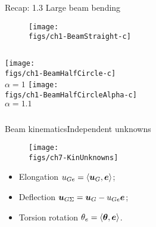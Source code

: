 \begin{frame}{Recap: 1.3 Large beam bending}

\vskip-20pt
\begin{figure}
\centering\texttt{[image: \\figs/ch1-BeamStraight-c]}
\end{figure}
\vskip-10pt
\begin{columns}
\centering\texttt{[image: \\figs/ch1-BeamHalfCircle-c]}\\
$\alpha=1$
\centering\texttt{[image: \\figs/ch1-BeamHalfCircleAlpha-c]}\\
$\alpha=1.1$
\end{columns}

\end{frame}

\begin{frame}{Beam kinematics}{Independent unknowns}

\begin{figure}
\centering\texttt{[image: \\figs/ch7-KinUnknowns]}
\end{figure}

\begin{itemize}
\item Elongation $u_{Ge}=\left\langle{{\boldsymbol{u}}_G,{\boldsymbol{e}}}\right\rangle$;
\item Deflection ${\boldsymbol{u}}_{G\Sigma}={\boldsymbol{u}}_G-u_{Ge}{\boldsymbol{e}}$;
\item Torsion rotation $\theta_e=\left\langle{{\boldsymbol{\theta}},{\boldsymbol{e}}}\right\rangle$.
\end{itemize}

\end{frame}
